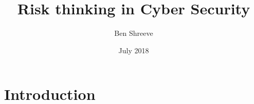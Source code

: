 \documentclass{article}
\title{Risk thinking in Cyber Security}
\author{Ben Shreeve}
\date{July 2018}
\begin{document}
\maketitle

\section{Introduction}
\end{document}
